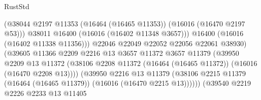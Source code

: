 \begin{lexlean}{RustStd}
\begin{coremodule}
                                              (@38044
                                                @2197
                                                @11353
                                                (@16464 (@16465 @11353))
                                                (@16016 (@16470 @2197 @53)))
                                              @38011
                                              @16400
                                              (@16016 (@16402 @11348 @3657)))
                                            @16400
                                            (@16016 (@16402 @11338 @11356)))
                                          @22046
                                          @22049
                                          @22052
                                          @22056
                                          @22061
                                          @38930)
                                        (@39605
                                          @11366
                                          @2209
                                          @2216
                                          @13
                                          @3657
                                          @11372
                                          @3657
                                          @11379
                                          (@39950
                                            @2209
                                            @13
                                            @11372
                                            (@38106
                                              @2208
                                              @11372
                                              (@16464 (@16465 @11372))
                                              (@16016 (@16470 @2208 @13))))
                                          (@39950
                                            @2216
                                            @13
                                            @11379
                                            (@38106
                                              @2215
                                              @11379
                                              (@16464 (@16465 @11379))
                                              (@16016 (@16470 @2215 @13))))))
                                      (@39540
                                        @2219
                                        @2226
                                        @2233
                                        @13
                                        @11405

\end{coremodule}
\end{lexlean}

